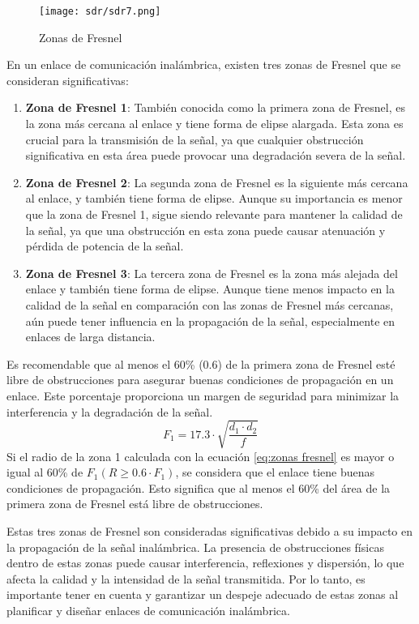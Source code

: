 \documentclass[
	12pt, %
	fleqn, %
	a4paper, %
	oneside, %
]{LegrandOrangeBook}
\begin{document}
\begin{figure}[H]
\centering
\texttt{[image: sdr/sdr7.png]}
\caption{Zonas de Fresnel}
\end{figure}
En un enlace de comunicación inalámbrica, existen tres zonas de Fresnel que se consideran significativas:
\begin{enumerate}
\item \textbf{Zona de Fresnel 1}: También conocida como la primera zona de Fresnel, es la zona más cercana al enlace y tiene forma de elipse alargada. Esta zona es crucial para la transmisión de la señal, ya que cualquier obstrucción significativa en esta área puede provocar una degradación severa de la señal.
\item \textbf{Zona de Fresnel 2}: La segunda zona de Fresnel es la siguiente más cercana al enlace, y también tiene forma de elipse. Aunque su importancia es menor que la zona de Fresnel 1, sigue siendo relevante para mantener la calidad de la señal, ya que una obstrucción en esta zona puede causar atenuación y pérdida de potencia de la señal.
\item \textbf{Zona de Fresnel 3}: La tercera zona de Fresnel es la zona más alejada del enlace y también tiene forma de elipse. Aunque tiene menos impacto en la calidad de la señal en comparación con las zonas de Fresnel más cercanas, aún puede tener influencia en la propagación de la señal, especialmente en enlaces de larga distancia.
\end{enumerate}
\begin{remark}
Es recomendable que al menos el 60\% (0.6) de la primera zona de Fresnel esté libre de obstrucciones para asegurar buenas condiciones de propagación en un enlace. Este porcentaje proporciona un margen de seguridad para minimizar la interferencia y la degradación de la señal.
\begin{equation}
F_1=17.3\cdot\sqrt{\frac{d_1\cdot d_2}{f}}
\end{equation}
Si el radio de la zona 1 calculada con la ecuación \ref{eq:zonas fresnel} es mayor o igual al 60\% de $F_1 (R \geq 0.6 \cdot F_1)$, se considera que el enlace tiene buenas condiciones de propagación. Esto significa que al menos el 60\% del área de la primera zona de Fresnel está libre de obstrucciones.
\end{remark}
Estas tres zonas de Fresnel son consideradas significativas debido a su impacto en la propagación de la señal inalámbrica. La presencia de obstrucciones físicas dentro de estas zonas puede causar interferencia, reflexiones y dispersión, lo que afecta la calidad y la intensidad de la señal transmitida. Por lo tanto, es importante tener en cuenta y garantizar un despeje adecuado de estas zonas al planificar y diseñar enlaces de comunicación inalámbrica.
\end{document}
